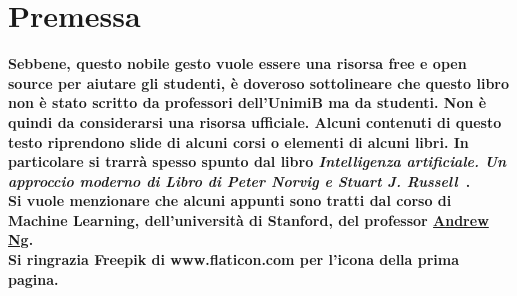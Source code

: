 \documentclass[a4paper,12pt, oneside]{book}
\begin{document}

\tableofcontents %


\renewcommand{\chaptermark}[1]{%
  \markboth{\chaptername
    \ \thechapter.\ #1}{}}
\renewcommand{\sectionmark}[1]{\markright{\thesection.\ #1}}
\newcommand{\floor}[1]{\lfloor #1 \rfloor}
\newcommand{\MYhref}[3][blue]{\href{#2}{\color{#1}{#3}}}%


\chapter*{Premessa}
\textbf{Sebbene, questo nobile gesto vuole essere una risorsa free e open source per aiutare gli studenti, è doveroso sottolineare che questo libro non è stato scritto da professori dell'UnimiB ma da studenti. Non è quindi da considerarsi una risorsa ufficiale. Alcuni contenuti di questo testo riprendono slide di alcuni corsi o elementi di alcuni libri. In particolare si trarrà spesso spunto dal libro \textit{Intelligenza artificiale. Un approccio moderno di Libro di Peter Norvig e Stuart J. Russell}~\cite{russell2005intelligenza}. \\ Si vuole menzionare che alcuni appunti sono tratti dal corso di Machine Learning, dell'università di Stanford, del professor \href{https://scholar.google.com/citations?user=mG4imMEAAAAJ&hl=it&oi=ao}{Andrew Ng}. \\ Si ringrazia Freepik di www.flaticon.com per l'icona della prima pagina.}









\printbibliography
\end{document}
